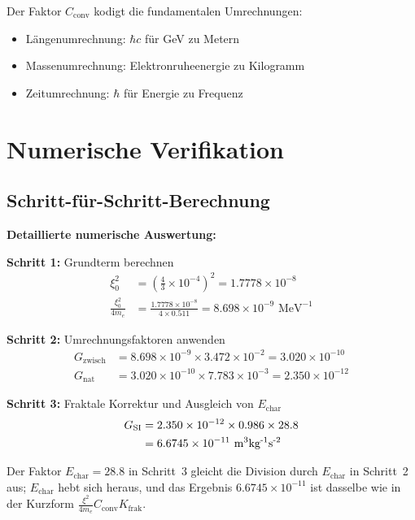 	Der Faktor $C_{\text{conv}}$ kodigt die fundamentalen Umrechnungen:
	\begin{itemize}
		\item Längenumrechnung: $\hbar c$ für GeV zu Metern
		\item Massenumrechnung: Elektronruheenergie zu Kilogramm
		\item Zeitumrechnung: $\hbar$ für Energie zu Frequenz
	\end{itemize}
	
	\section{Numerische Verifikation}
	
	\subsection{Schritt-für-Schritt-Berechnung}
	
	\begin{verification}
		\textbf{Detaillierte numerische Auswertung:}
		
		\textbf{Schritt 1:} Grundterm berechnen
		\begin{align}
			\xi_0^2 &= \left(\frac{4}{3} \times 10^{-4}\right)^2 = 1.7778 \times 10^{-8} \\
			\frac{\xi_0^2}{4 m_e} &= \frac{1.7778 \times 10^{-8}}{4 \times 0.511} = 8.698 \times 10^{-9} \text{ MeV}^{-1}
		\end{align}
		
		\textbf{Schritt 2:} Umrechnungsfaktoren anwenden
		\begin{align}
			G_{\text{zwisch}} &= 8.698 \times 10^{-9} \times 3.472 \times 10^{-2} = 3.020 \times 10^{-10} \\
			G_{\text{nat}} &= 3.020 \times 10^{-10} \times 7.783 \times 10^{-3} = 2.350 \times 10^{-12}
		\end{align}
		
		\textbf{Schritt 3:} Fraktale Korrektur und Ausgleich von $E_{\text{char}}$
		\begin{align}
			G_{\text{SI}} &= 2.350 \times 10^{-12} \times 0.986 \times 28.8 \\
			&= 6.6745 \times 10^{-11} \text{ m\textsuperscript{3}kg\textsuperscript{-1}s\textsuperscript{-2}}
		\end{align}

		Der Faktor $E_{\text{char}} = 28.8$ in Schritt~3 gleicht die Division durch $E_{\text{char}}$ in Schritt~2 aus; $E_{\text{char}}$ hebt sich heraus, und das Ergebnis $6.6745\times10^{-11}$ ist dasselbe wie in der Kurzform $\frac{\xi^2}{4m_e}C_{\text{conv}}K_{\text{frak}}$.
	\end{verification}
	
